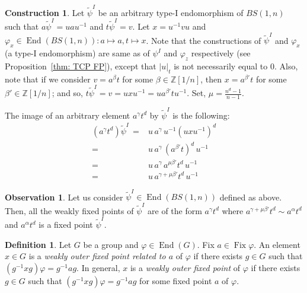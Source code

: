 \documentclass[a4paper]{amsart}
\theoremstyle{definition}
\newtheorem{dfn}[thm]{Definition}
\newtheorem{obs}[thm]{Observation}
\newtheorem{con}[thm]{Construction}
\newcommand\ZZ{\mathbb{Z}}
\newcommand{\End}{\operatorname{End}}
\newcommand{\Fix}{\operatorname{Fix}}
\begin{document}
\begin{con}\label{con: main con}
Let $\widetilde{\psi}^I$ be an arbitrary type-I endomorphism of $BS(1,n)$ such that $a\widetilde{\psi}^I = uau^{-1}$ and $t\widetilde{\psi}^I = v$. Let $x = u^{-1}vu$ and $\varphi_x \in \End(BS(1,n)) \colon a \mapsto a, t \mapsto x$. Note that the constructions of $\widetilde{\psi}^I$ and $\varphi_x$ (a type-I endomorphism) are same as of $\psi^I$ and $\varphi_z$ respectively (see Proposition~\ref {thm: TCP FP}), except that $|u|_t$ is not necessarily equal to $0$. Also, note that if we consider $v = a^{\beta} t$ for some $\beta \in \ZZ[1/n]$, then $x = a^{\beta'} t$ for some $\beta' \in \ZZ[1/n]$; and so, $t\widetilde{\psi}^I = v = uxu^{-1} = u a^{\beta'} t u^{-1}$. Set,  $\mu = \frac{n^d - 1}{n-1}$.

The image of an arbitrary element $a^{\gamma}t^d$ by $\widetilde{\psi}^I$ is the following:
%
$$
\begin{array}{rl}
    (a^{\gamma}t^d)\widetilde{\psi}^I\, = & u\, a^{\gamma}\, u^{-1} (uxu^{-1})^d \\
    = & u\, a^{\gamma}\, (a^{\beta'}t)^d \, u^{-1}\\
    = & u\, a^{\gamma}\, a^{\mu\beta'}t^d \, u^{-1}\\
    = & u\, a^{\gamma + \mu\beta'}t^d \, u^{-1}
\end{array}
$$
%
\end{con}

\begin{obs}\label{obs: WFP}
    Let us consider $\widetilde{\psi}^{I} \in \End(BS(1,n))$ defined as above. Then, all the weakly fixed points of $\widetilde{\psi}^{I}$ are of the form $a^\gamma t^d$ where $a^{\gamma + \mu \beta'} t^d \sim a^{\alpha} t^d$ and $a^{\alpha} t^d$ is a fixed point $\widetilde{\psi}^{I}$.
\end{obs}


\begin{dfn}
    Let $G$ be a group and $\varphi \in \End(G)$. Fix $a \in \Fix \varphi$. An element $x \in G$ is a \emph{weakly outer fixed point related to $a$} of $\varphi$ if there exists $g \in G$ such that $(g^{-1} x g)\varphi = g^{-1} a g$.
    In general, $x$ is a \emph{weakly outer fixed point} of $\varphi$ if there exists $g \in G$ such that $(g^{-1} x g)\varphi = g^{-1} a g$ for some fixed point $a$ of $\varphi$.
\end{dfn}
\end{document}
